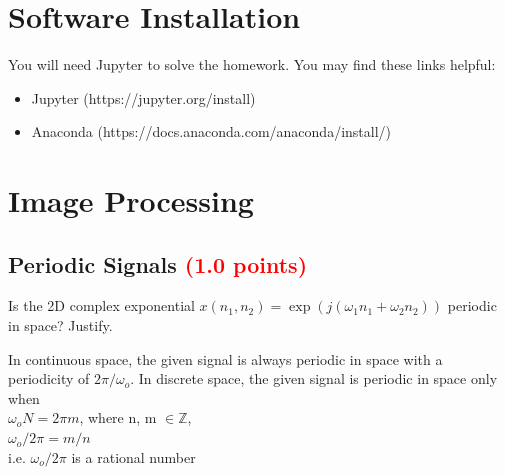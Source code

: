 \documentclass[answers]{exam}
\newcommand{\mypoints}[1]{\textcolor{red}{(#1 points)}}
\begin{document}
\section*{Software Installation}

You will need Jupyter to solve the homework. 
You may find these links helpful: 
\begin{itemize}
    \item Jupyter (https://jupyter.org/install)
    \item Anaconda (https://docs.anaconda.com/anaconda/install/)
\end{itemize}

\newpage
\section{Image Processing}
\label{Signal Processing 101}
\subsection{Periodic Signals \mypoints{1.0}}
Is the 2D complex exponential $x(n_1, n_2) = \exp(j(\omega_1n_1 + \omega_2 n_2))$ periodic in space? Justify.
\begin{solution}
In continuous space, the given signal is always periodic in space with a periodicity of $2\pi/\omega_o$.
In discrete space, the given signal is periodic in space only when\\
$\omega_o N=2 \pi m$, where n, m $\in  \mathbb{Z}$,\\
$\omega_o/ 2\pi = m/n$\\
i.e. $\omega_o/ 2\pi$ is a rational number
\end{solution}
\end{document}
